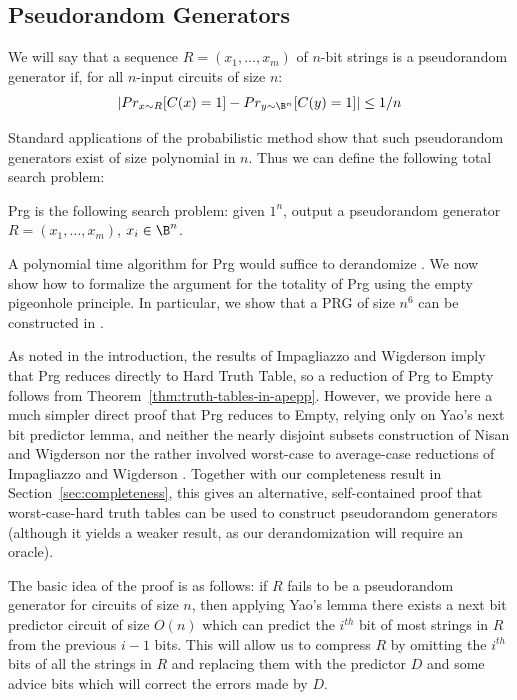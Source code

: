 \subsection{Pseudorandom Generators}
\begin{definition}
We will say that a sequence $R = (x_1, \ldots, x_m)$ of $n$-bit strings is a pseudorandom generator if, for all $n$-input circuits of size $n$:
\[
|Pr_{x \sim R}[C(x)=1] - Pr_{y \sim \B^n}[C(y)=1]| \leq 1/n
\]
\end{definition}

Standard applications of the probabilistic method show that such pseudorandom generators exist of size polynomial in $n$. Thus we can define the following total search problem:
\begin{definition}
{\sc Prg} is the following search problem: given $1^n$, output a pseudorandom generator $R = (x_1, \ldots, x_m)$, $x_i \in \B^n$.
\end{definition}

A polynomial time algorithm for {\sc Prg} would suffice to derandomize  \cite{NW}. We now show how to formalize the argument for the totality of {\sc Prg} using the empty pigeonhole principle. In particular, we show that a PRG of size $n^6$ can be constructed in .

As noted in the introduction, the results of Impagliazzo and Wigderson \cite{IW} imply that {\sc Prg} reduces directly to {\sc Hard Truth Table}, so a reduction of {\sc Prg} to {\sc Empty} follows from Theorem~\ref{thm:truth-tables-in-apepp}. However, we provide here a much simpler direct proof that {\sc Prg} reduces to {\sc Empty}, relying only on Yao's next bit predictor lemma, and neither the nearly disjoint subsets construction of Nisan and Wigderson \cite{NW} nor the rather involved worst-case to average-case reductions of Impagliazzo and Wigderson \cite{IW}. Together with our completeness result in Section~\ref{sec:completeness}, this gives an alternative, self-contained proof that worst-case-hard truth tables can be used to construct pseudorandom generators (although it yields a weaker result, as our derandomization will require an  oracle).

The basic idea of the proof is as follows: if $R$ fails to be a pseudorandom generator for circuits of size $n$, then applying Yao's lemma there exists a next bit predictor circuit of size $O(n)$ which can predict the $i^{th}$ bit of most strings in $R$ from the previous $i-1$ bits. This will allow us to compress $R$ by omitting the $i^{th}$ bits of all the strings in $R$ and replacing them with the predictor $D$ and some advice bits which will correct the errors made by $D$.

